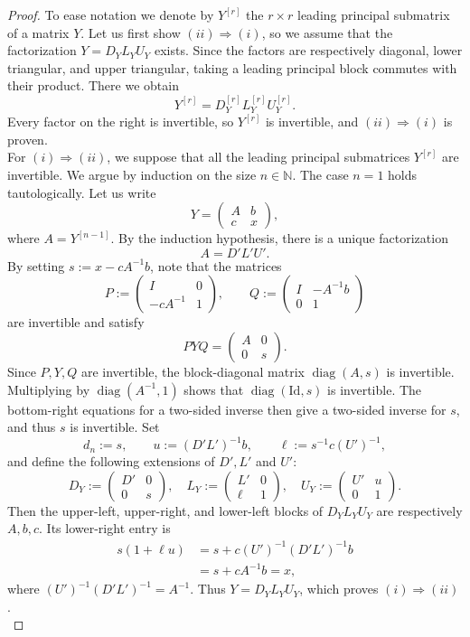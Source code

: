 \documentclass[10pt,a4paper]{amsart}
\newcommand{\diag}{\operatorname{diag}}
\begin{document}
\begin{proof}
To ease notation we denote by $ Y^{[r]}$ the $r\times r$ leading principal submatrix of a matrix $Y$. Let us first show $(ii)\Longrightarrow(i)$, so we assume that the factorization \(Y=D_YL_YU_Y\) exists.  Since the factors are respectively
diagonal, lower triangular, and upper triangular, taking a leading
principal block commutes with their product. There we obtain
\[
 Y^{[r]}=D_Y^{[r]}L_Y^{[r]}U_Y^{[r]}.
\]
Every factor on the right is invertible, so \(Y^{[r]}\) is invertible, and $(ii)\Longrightarrow(i)$ is proven.\\

For $(i)\Longrightarrow(ii)$, we suppose that all the leading principal submatrices \(Y^{[r]}\) are invertible.  We argue by
induction on the size \(n\in\mathbb{N}\).  The case \(n=1\) holds tautologically. Let us write
\[
 Y=\begin{pmatrix}A&b\\ c&x\end{pmatrix},
\]
where \(A=Y^{[n-1]}\).  By the induction hypothesis, there is a unique factorization
\[
 A=D'L'U'.
\]
By setting $s:=x-cA^{-1}b$, note that the matrices
\[
 P:=\begin{pmatrix}I&0\\-cA^{-1}&1\end{pmatrix},
 \qquad
 Q:=\begin{pmatrix}I&-A^{-1}b\\0&1\end{pmatrix}
\]
are invertible and satisfy
\[
 PYQ=\begin{pmatrix}A&0\\0&s\end{pmatrix}.
\]
Since \(P,Y,Q\) are invertible, the block-diagonal matrix
\(\diag(A,s)\) is invertible.  Multiplying by
\(\diag(A^{-1},1)\) shows that \(\diag(\mbox{Id},s)\) is invertible. The
bottom-right equations for a two-sided inverse then give a two-sided
inverse for \(s\), and thus \(s\) is invertible.
Set
\[
 d_n:=s,
 \qquad
 u:=(D'L')^{-1}b,
 \qquad
 \ell:=s^{-1}c(U')^{-1},
\]
and define the following extensions of $D',L'$ and $U'$:
\[
 D_Y:=\begin{pmatrix}D'&0\\0&s\end{pmatrix},
 \quad
 L_Y:=\begin{pmatrix}L'&0\\\ell&1\end{pmatrix},
 \quad
 U_Y:=\begin{pmatrix}U'&u\\0&1\end{pmatrix}.
\]
Then the upper-left, upper-right, and lower-left blocks of
\(D_YL_YU_Y\) are respectively \(A,b,c\).  Its lower-right entry is
\begin{align*}
 s(1+\ell u)
 &=s+c(U')^{-1}(D'L')^{-1}b\\
 &=s+cA^{-1}b=x,
\end{align*}
where
\((U')^{-1}(D'L')^{-1}=A^{-1}\).  Thus \(Y=D_YL_YU_Y\), which proves  $(i)\Longrightarrow(ii)$.\\


\end{proof}
\end{document}
